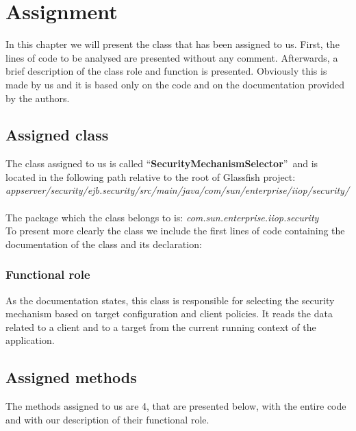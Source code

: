 \documentclass[\mainpath/main]{subfiles}
\begin{document}
\chapter{Assignment} %
\label{Assignment}

\setmyfancystyle

In this chapter we will present the class that has been assigned to us. First, the lines of code to be analysed are presented without any comment. Afterwards, a brief description of the class role and function is presented. Obviously this is made by us and it is based only on the code and on the documentation provided by the authors. 

\section{Assigned class}
\label{Assignment:AssignedClass}
The class assigned to us is called \textquotedblleft \textbf{SecurityMechanismSelector}\textquotedblright\ and is located in the following path relative to the root of Glassfish project:\\
\textit{
appserver/security/ejb.security/src/main/java/com/sun/enterprise/iiop/security/
}\\ \\
The package which the class belongs to is: \textit{com.sun.enterprise.iiop.security}\\
To present more clearly the class we include the first lines of code containing the documentation of the class and its declaration:


\subsection{Functional role}
As the documentation states, this class is responsible for selecting the security mechanism based on target configuration and client policies. It reads the data related to a client and to a target from the current running context of the application.

\section{Assigned methods}
\label{Assignment:AssignedMethods}
The methods assigned to us are 4, that are presented below, with the entire code and with our description of their functional role.
\end{document}
